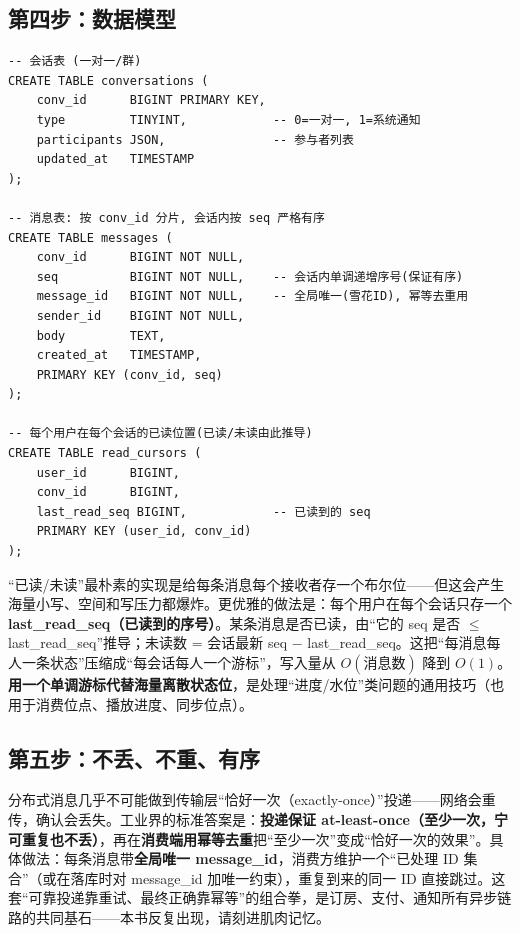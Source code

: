 \subsection{第四步：数据模型}

\begin{lstlisting}
-- 会话表 (一对一/群)
CREATE TABLE conversations (
    conv_id      BIGINT PRIMARY KEY,
    type         TINYINT,            -- 0=一对一, 1=系统通知
    participants JSON,               -- 参与者列表
    updated_at   TIMESTAMP
);

-- 消息表: 按 conv_id 分片, 会话内按 seq 严格有序
CREATE TABLE messages (
    conv_id      BIGINT NOT NULL,
    seq          BIGINT NOT NULL,    -- 会话内单调递增序号(保证有序)
    message_id   BIGINT NOT NULL,    -- 全局唯一(雪花ID), 幂等去重用
    sender_id    BIGINT NOT NULL,
    body         TEXT,
    created_at   TIMESTAMP,
    PRIMARY KEY (conv_id, seq)
);

-- 每个用户在每个会话的已读位置(已读/未读由此推导)
CREATE TABLE read_cursors (
    user_id      BIGINT,
    conv_id      BIGINT,
    last_read_seq BIGINT,            -- 已读到的 seq
    PRIMARY KEY (user_id, conv_id)
);
\end{lstlisting}

\begin{idea}
“已读/未读”最朴素的实现是给每条消息每个接收者存一个布尔位——但这会产生海量小写、空间和写压力都爆炸。更优雅的做法是：每个用户在每个会话只存一个 \textbf{last\_read\_seq（已读到的序号）}。某条消息是否已读，由“它的 seq 是否 $\le$ last\_read\_seq”推导；未读数 = 会话最新 seq $-$ last\_read\_seq。这把“每消息每人一条状态”压缩成“每会话每人一个游标”，写入量从 $O(\text{消息数})$ 降到 $O(1)$。\textbf{用一个单调游标代替海量离散状态位}，是处理“进度/水位”类问题的通用技巧（也用于消费位点、播放进度、同步位点）。
\end{idea}

\subsection{第五步：不丢、不重、有序}

\begin{idea}[at-least-once + 幂等消费 = 恰好一次效果]
分布式消息几乎不可能做到传输层“恰好一次（exactly-once）”投递——网络会重传，确认会丢失。工业界的标准答案是：\textbf{投递保证 at-least-once（至少一次，宁可重复也不丢）}，再在\textbf{消费端用幂等去重}把“至少一次”变成“恰好一次的效果”。具体做法：每条消息带\textbf{全局唯一 message\_id}，消费方维护一个“已处理 ID 集合”（或在落库时对 message\_id 加唯一约束），重复到来的同一 ID 直接跳过。这套“可靠投递靠重试、最终正确靠幂等”的组合拳，是订房、支付、通知所有异步链路的共同基石——本书反复出现，请刻进肌肉记忆。
\end{idea}


